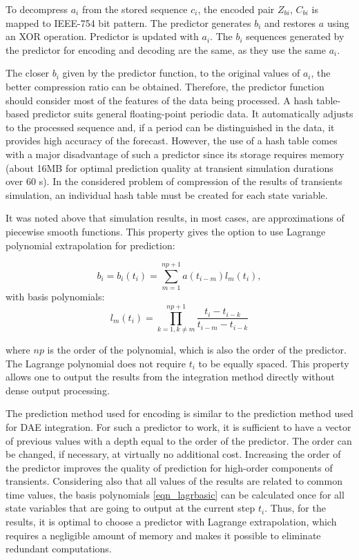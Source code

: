\documentclass[conference]{IEEEtran}
\begin{document}
To decompress \(a_i\) from the stored sequence \(c_i\), the encoded pair \(Z_{bi}\), \(C_{bi}\) 
is mapped to IEEE-754 bit pattern. 
The predictor generates \(b_i\) and restores \(a\) using an XOR operation.
Predictor is updated with \(a_i\). The \(b_i\) sequences generated by the predictor for encoding and decoding are the same, as they use the same \(a_i\).

The closer \(b_i\) given by the predictor function, to the original values of \(a_i\), the better compression ratio can be obtained. 
Therefore, the predictor function should consider most of the features of the data being processed. 
A hash table-based predictor suits general floating-point periodic data. It automatically adjusts to the processed sequence and, if a period can be distinguished in the data, it provides high accuracy of the forecast. 
However, the use of a hash table comes with a major disadvantage of such a predictor since 
its storage requires memory (about 16MB for optimal prediction quality at transient simulation durations over 60 s). 
In the considered problem of compression of the results of transients simulation, an individual hash table must be created for each state variable.

It was noted above that simulation results, in most cases, are approximations of piecewise smooth functions.
This property gives the option to use Lagrange polynomial extrapolation for prediction:

\begin{equation}
	\label{eqn_lagrb}
	b_i=b_i(t_i)=\sum_{m=1}^{np+1} a(t_{i-m})l_m(t_i),
\end{equation}
\noindent with basis polynomials:
\begin{equation}
	\label{eqn_lagrbasic}
	l_m(t_i)=\prod_{k=1, k \neq m}^{np+1} \frac{t_i-t_{i-k}}{t_{i-m}-t_{i-k}}
\end{equation}

\noindent where \(np\) is the order of the polynomial, which is also the order of the predictor. 
The Lagrange polynomial does not require \(t_i\) to be equally spaced. This property allows one to output the results from the integration method directly without dense output processing.

The prediction method used for encoding is similar to the prediction method used for DAE integration. 
For such a predictor to work, it is sufficient to have a vector of previous values with a depth equal to the order of the predictor. 
The order can be changed, if necessary, at virtually no additional cost. 
Increasing the order of the predictor improves the quality of prediction for high-order components of transients. 
Considering also that all values of the results are related to common time values, the basis polynomials \ref{eqn_lagrbasic} can be calculated once 
for all state variables that are going to output at the current step \(t_i\). Thus, for the results, it is optimal 
to choose a predictor with Lagrange extrapolation, which requires a negligible amount of memory and makes it possible to eliminate redundant computations.
\end{document}
